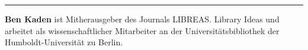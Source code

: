 \begin{center}\rule{0.5\linewidth}{\linethickness}\end{center}

\textbf{Ben Kaden} ist Mitherausgeber des Journals LIBREAS. Library
Ideas und arbeitet als wissenschaftlicher Mitarbeiter an der
Universitätsbibliothek der Humboldt-Universität zu Berlin.
